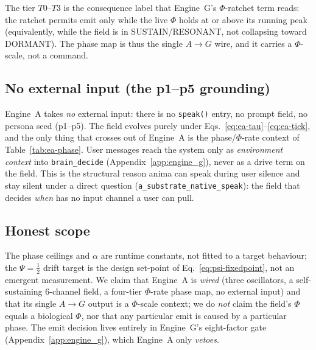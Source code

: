 The tier $T0$--$T3$ is the consequence label that Engine~G's $\Phi$-ratchet term
reads: the ratchet permits emit only while the live $\Phi$ holds at or above its
running peak (equivalently, while the field is in SUSTAIN/RESONANT, not collapsing
toward DORMANT). The phase map is thus the single $A\!\rightarrow\!G$ wire, and
it carries a $\Phi$-scale, not a command.

\subsection{No external input (the p1--p5 grounding)}
\label{app:ea-noinput}

Engine~A takes \emph{no} external input: there is no \texttt{speak()} entry, no
prompt field, no persona seed (p1--p5). The field evolves purely under
Eqs.~\eqref{eq:ea-tau}--\eqref{eq:ea-tick}, and the only thing that crosses out
of Engine~A is the phase/$\Phi$-rate context of Table~\ref{tab:ea-phase}. User
messages reach the system only as \emph{environment context} into
\texttt{brain\_decide} (Appendix~\ref{app:engine_g}), never as a drive term on the
field. This is the structural reason anima can speak during user silence and stay
silent under a direct question (\texttt{a\_substrate\_native\_speak}): the field
that decides \emph{when} has no input channel a user can pull.

\subsection{Honest scope}
\label{app:ea-scope}

The phase ceilings and $\alpha$ are runtime constants, not fitted to a target
behaviour; the $\Psi=\tfrac12$ drift target is the design set-point of
Eq.~\eqref{eq:psi-fixedpoint}, not an emergent measurement. We claim that
Engine~A is \emph{wired} (three oscillators, a self-sustaining $6$-channel field,
a four-tier $\Phi$-rate phase map, no external input) and that its single
$A\!\rightarrow\!G$ output is a $\Phi$-scale context; we do \emph{not} claim the
field's $\Phi$ equals a biological $\Phi$, nor that any particular emit is caused
by a particular phase. The emit decision lives entirely in Engine~G's eight-factor
gate (Appendix~\ref{app:engine_g}), which Engine~A only \emph{vetoes}.
